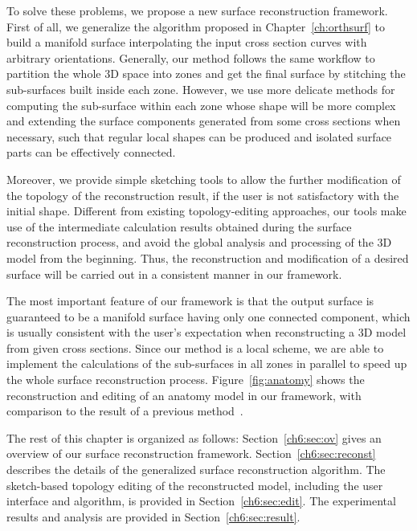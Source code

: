 To solve these problems,  we propose a new surface reconstruction
framework. First of all, we generalize the algorithm
proposed in Chapter~\ref{ch:orthsurf} to build a manifold surface interpolating the input cross section curves with arbitrary orientations. Generally, our method follows the same workflow to partition the whole 3D
space into zones and get the final surface by stitching the
sub-surfaces built inside each zone. However, we use more delicate methods for computing the sub-surface within each zone whose shape will be more complex and extending the surface components generated from some cross sections when necessary, such that regular local shapes can be produced and isolated surface parts can be effectively connected.

Moreover, we provide simple sketching tools to allow the further
modification of the topology of the reconstruction result, if the
user is not satisfactory with the initial shape. Different from
existing topology-editing approaches, our tools make use of the
intermediate calculation results obtained during the surface
reconstruction process, and avoid the global analysis and
processing of the 3D model from the beginning. Thus, the
reconstruction and modification of a desired surface will be carried out
in a consistent manner in our framework.

The most important feature of  our framework is that the output
surface is guaranteed to be a manifold surface having only one
connected component, which is usually consistent with the user's
expectation when reconstructing a 3D model from given cross
sections. Since our method is a local scheme, we are able to
implement the calculations of the sub-surfaces in all zones in
parallel to speed up the whole surface reconstruction process.
Figure~\ref{fig:anatomy} shows the reconstruction and editing of an
anatomy model in our framework, with comparison to the result of a
previous method~\cite{LBDLJ08}.

The rest of this chapter is organized as  follows:
Section~\ref{ch6:sec:ov} gives an overview of our surface
reconstruction framework. Section~\ref{ch6:sec:reconst} describes
the details of the generalized surface reconstruction algorithm. The
sketch-based topology editing of the reconstructed model, including
the user interface and algorithm, is provided in
Section~\ref{ch6:sec:edit}. The experimental results and analysis
are provided in Section~\ref{ch6:sec:result}.




